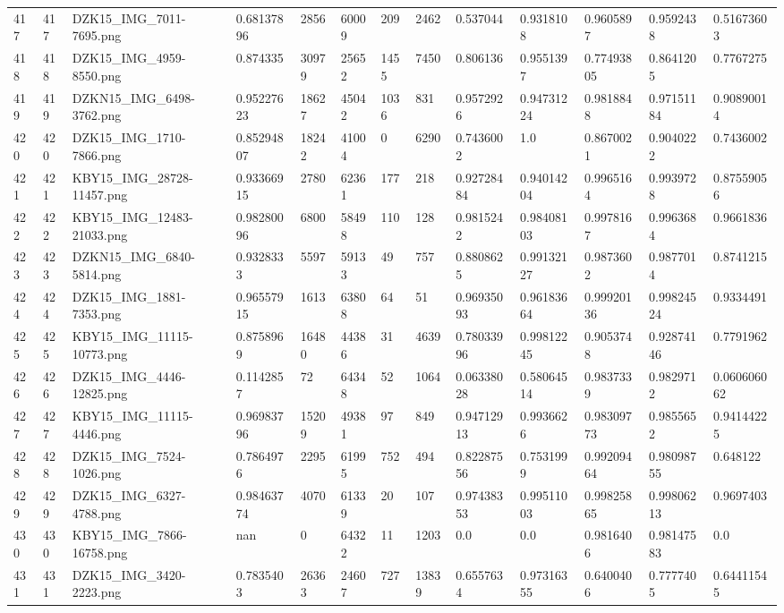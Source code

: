 \documentclass[11pt, a4paper, twoside]{report}
\begin{document}
\begin{longtable}[c]{@{}lllllllllllll@{}}
417 & 417 & DZK15\_IMG\_7011-7695.png & 0.68137896 & 2856 & 60009 & 209 & 2462 & 0.537044 & 0.9318108 & 0.9605897 & 0.9592438 & 0.51673603 \\
418 & 418 & DZK15\_IMG\_4959-8550.png & 0.874335 & 30979 & 25652 & 1455 & 7450 & 0.806136 & 0.9551397 & 0.77493805 & 0.8641205 & 0.7767275 \\
419 & 419 & DZKN15\_IMG\_6498-3762.png & 0.95227623 & 18627 & 45042 & 1036 & 831 & 0.9572926 & 0.94731224 & 0.9818848 & 0.97151184 & 0.90890014 \\
420 & 420 & DZK15\_IMG\_1710-7866.png & 0.85294807 & 18242 & 41004 & 0 & 6290 & 0.7436002 & 1.0 & 0.8670021 & 0.9040222 & 0.7436002 \\
421 & 421 & KBY15\_IMG\_28728-11457.png & 0.93366915 & 2780 & 62361 & 177 & 218 & 0.92728484 & 0.94014204 & 0.9965164 & 0.9939728 & 0.87559056 \\
422 & 422 & KBY15\_IMG\_12483-21033.png & 0.98280096 & 6800 & 58498 & 110 & 128 & 0.9815242 & 0.98408103 & 0.9978167 & 0.9963684 & 0.9661836 \\
423 & 423 & DZKN15\_IMG\_6840-5814.png & 0.9328333 & 5597 & 59133 & 49 & 757 & 0.8808625 & 0.99132127 & 0.9873602 & 0.9877014 & 0.8741215 \\
424 & 424 & DZK15\_IMG\_1881-7353.png & 0.96557915 & 1613 & 63808 & 64 & 51 & 0.96935093 & 0.96183664 & 0.99920136 & 0.99824524 & 0.9334491 \\
425 & 425 & KBY15\_IMG\_11115-10773.png & 0.8758969 & 16480 & 44386 & 31 & 4639 & 0.78033996 & 0.99812245 & 0.9053748 & 0.92874146 & 0.7791962 \\
426 & 426 & DZK15\_IMG\_4446-12825.png & 0.1142857 & 72 & 64348 & 52 & 1064 & 0.06338028 & 0.58064514 & 0.9837339 & 0.9829712 & 0.060606062 \\
427 & 427 & KBY15\_IMG\_11115-4446.png & 0.96983796 & 15209 & 49381 & 97 & 849 & 0.94712913 & 0.9936626 & 0.98309773 & 0.9855652 & 0.94144225 \\
428 & 428 & DZK15\_IMG\_7524-1026.png & 0.7864976 & 2295 & 61995 & 752 & 494 & 0.82287556 & 0.7531999 & 0.99209464 & 0.98098755 & 0.648122 \\
429 & 429 & DZK15\_IMG\_6327-4788.png & 0.98463774 & 4070 & 61339 & 20 & 107 & 0.97438353 & 0.99511003 & 0.99825865 & 0.99806213 & 0.9697403 \\
430 & 430 & KBY15\_IMG\_7866-16758.png & nan & 0 & 64322 & 11 & 1203 & 0.0 & 0.0 & 0.9816406 & 0.98147583 & 0.0 \\
431 & 431 & DZK15\_IMG\_3420-2223.png & 0.7835403 & 26363 & 24607 & 727 & 13839 & 0.6557634 & 0.97316355 & 0.6400406 & 0.7777405 & 0.64411545 \\

\end{longtable}
\end{document}
